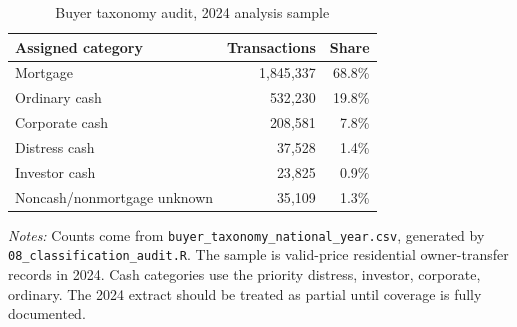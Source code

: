\begin{table}[!htbp]
\centering
\caption{Buyer taxonomy audit, 2024 analysis sample}
\label{tab:taxonomy-audit}
\begin{tabular}{lrr}
\toprule
Assigned category & Transactions & Share \\
\midrule
Mortgage & 1{,}845{,}337 & 68.8\% \\
Ordinary cash & 532{,}230 & 19.8\% \\
Corporate cash & 208{,}581 & 7.8\% \\
Distress cash & 37{,}528 & 1.4\% \\
Investor cash & 23{,}825 & 0.9\% \\
Noncash/nonmortgage unknown & 35{,}109 & 1.3\% \\
\bottomrule
\end{tabular}
\begin{minipage}{0.92\linewidth}
\footnotesize\raggedright
\emph{Notes:} Counts come from \texttt{buyer\_taxonomy\_national\_year.csv}, generated by \texttt{08\_classification\_audit.R}. The sample is valid-price residential owner-transfer records in 2024. Cash categories use the priority distress, investor, corporate, ordinary. The 2024 extract should be treated as partial until coverage is fully documented.
\end{minipage}
\end{table}
